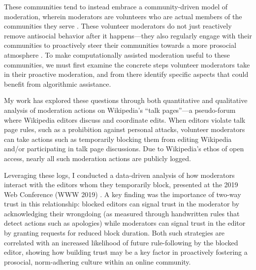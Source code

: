 \documentclass[11pt,letterpaper]{article}
\begin{document}
These communities tend to instead embrace a community-driven model of moderation, wherein moderators are volunteers who are actual members of the communities they serve \cite{lo_when_2018}.
These volunteer moderators do not just reactively remove antisocial behavior after it happens---they also regularly engage with their communities to proactively steer their communities towards a more prosocial atmosphere \cite{seering_shaping_2017,cai_what_2019}.
To make computationally assisted moderation useful to these communities, we must first examine the concrete steps volunteer moderators take in their proactive moderation, and from there identify specific aspects that could benefit from algorithmic assistance.

My work has explored these questions through both quantitative and qualitative analysis of moderation actions on Wikipedia's ``talk pages''---a pseudo-forum where Wikipedia editors discuss and coordinate edits.
When editors violate talk page rules, such as a prohibition against personal attacks, volunteer moderators can take actions such as temporarily blocking them from editing Wikipedia and/or participating in talk page discussions.
Due to Wikipedia's ethos of open access, nearly all such moderation actions are publicly logged.

Leveraging these logs, I conducted a data-driven analysis of how moderators interact with the editors whom they temporarily block, presented at the 2019 Web Conference (WWW 2019) \cite{chang_trajectories_2019}.
A key finding was the importance of two-way trust in this relationship: blocked editors can signal trust in the moderator by acknowledging their wrongdoing (as measured through handwritten rules that detect actions such as apologies) while moderators can signal trust in the editor by granting requests for reduced block duration.
Both such strategies are correlated with an increased likelihood of future rule-following by the blocked editor, showing how building trust may be a key factor in proactively fostering a prosocial, norm-adhering culture within an online community.


\end{document}
